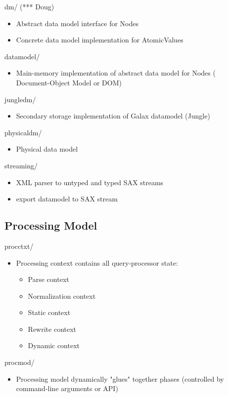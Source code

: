 dm/	    (*** Doug)
\begin{itemize}
\item   Abstract data model interface for Nodes
\item   Concrete data model implementation for AtomicValues 
\end{itemize}

datamodel/
\begin{itemize}
\item   Main-memory implementation of abstract data model for Nodes
  (~ Document-Object Model or DOM)
\end{itemize}

jungledm/	 
\begin{itemize}
\item   Secondary storage implementation of Galax datamodel (Jungle)
\end{itemize}

physicaldm/	 
\begin{itemize}
\item   Physical data model 
\end{itemize}
streaming/
\begin{itemize}
\item   XML parser to untyped and typed SAX streams
\item   export datamodel to SAX stream 
\end{itemize}

\subsection{Processing Model}
procctxt/ 
\begin{itemize}
\item   Processing context contains all query-processor state:
\begin{itemize}
\item      Parse context
\item      Normalization context
\item      Static context
\item      Rewrite context
\item      Dynamic context
\end{itemize}
\end{itemize}

procmod/
\begin{itemize}
\item    Processing model dynamically "glues" together phases (controlled by
  command-line arguments or API)
\end{itemize}

